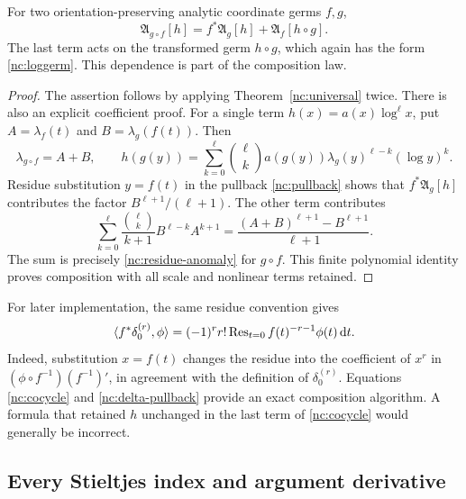 \begin{theorem}
\label{nc:composition}
For two orientation-preserving analytic coordinate germs $f,g$,
\begin{equation}\label{nc:cocycle}
 \boxed{\quad
 \mathfrak A_{g\circ f}[h]
    =f^*\mathfrak A_g[h]+\mathfrak A_f[h\circ g].
 \quad}
\end{equation}
The last term acts on the transformed germ $h\circ g$, which again has
the form \eqref{nc:loggerm}. This dependence is part of the composition
law.
\end{theorem}

\begin{proof}
The assertion follows by applying Theorem~\ref{nc:universal} twice.
There is also an explicit coefficient proof. For a single term
$h(x)=a(x)\log^\ell x$, put
$A=\lambda_f(t)$ and $B=\lambda_g(f(t))$. Then
\[
 \lambda_{g\circ f}=A+B,\qquad
 h(g(y))=\sum_{k=0}^\ell\binom\ell k
   a(g(y))\lambda_g(y)^{\ell-k}(\log y)^k.
\]
Residue substitution $y=f(t)$ in the pullback
\eqref{nc:pullback} shows that $f^*\mathfrak A_g[h]$ contributes the
factor $B^{\ell+1}/(\ell+1)$. The other term contributes
\[
 \sum_{k=0}^\ell\frac{\binom\ell k}{k+1}B^{\ell-k}A^{k+1}
 =\frac{(A+B)^{\ell+1}-B^{\ell+1}}{\ell+1}.
\]
The sum is precisely \eqref{nc:residue-anomaly} for $g\circ f$.
This finite polynomial identity proves composition with all scale and
nonlinear terms retained.
\end{proof}

For later implementation, the same residue convention gives
\begin{equation}\label{nc:delta-pullback}
 \langle f^*\delta_0^{(r)},\phi\rangle
   =(-1)^rr!\operatorname{Res}_{t=0}f(t)^{-r-1}\phi(t)\,\mathrm d t.
\end{equation}
Indeed, substitution $x=f(t)$ changes the residue into the coefficient
of $x^r$ in $(\phi\circ f^{-1})(f^{-1})'$, in agreement with the
definition of $\delta_0^{(r)}$. Equations
\eqref{nc:cocycle} and \eqref{nc:delta-pullback} provide an exact
composition algorithm. A formula that retained $h$ unchanged in the
last term of \eqref{nc:cocycle} would generally be incorrect.

\subsection{Every Stieltjes index and argument derivative}

